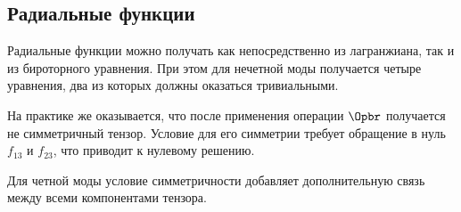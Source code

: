 \documentclass[\docroot/reports/draft/report.tex]{subfiles}
\begin{document}
\subsection{Радиальные функции}

    Радиальные функции можно получать как непосредственно из лагранжиана, так и из бироторного уравнения. При этом для нечетной моды получается четыре уравнения, два из которых должны оказаться тривиальными.

    На практике же оказывается, что после применения операции $\Opbr$ получается не симметричный тензор. Условие для его симметрии требует обращение в нуль $f_{13}$ и $f_{23}$, что приводит к нулевому решению.

    Для четной моды условие симметричности добавляет дополнительную связь между всеми компонентами тензора.

\end{document}
